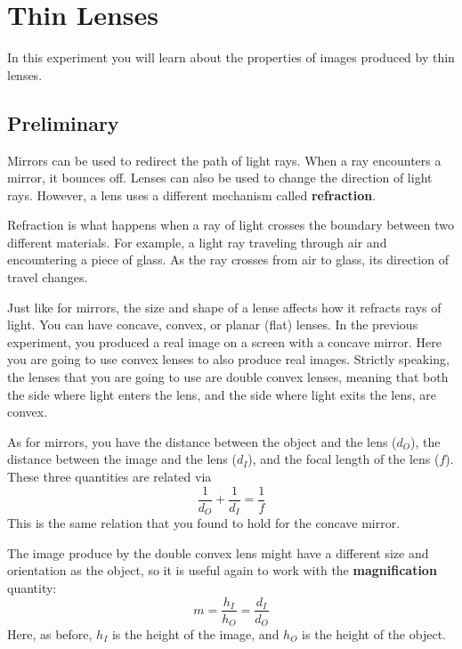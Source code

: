 \setcounter{chapter}{7}
\chapter{Thin Lenses}
In this experiment you will learn about the properties of images produced by thin lenses.
\section{Preliminary}
Mirrors can be used to redirect the path of light rays. When a ray encounters a mirror, it bounces off. Lenses can also be used to change the direction of light rays. However, a lens uses a different mechanism called \textbf{refraction}.

Refraction is what happens when a ray of light crosses the boundary between two different materials. For example, a light ray traveling through air and encountering a piece of glass. As the ray crosses from air to glass, its direction of travel changes.

Just like for mirrors, the size and shape of a lense affects how it refracts rays of light. You can have concave, convex, or planar (flat) lenses. In the previous experiment, you produced a real image on a screen with a concave mirror. Here you are going to use convex lenses to also produce real images. Strictly speaking, the lenses that you are going to use are double convex lenses, meaning that both the side where light enters the lens, and the side where light exits the lens, are convex.

As for mirrors, you have the distance between the object and the lens ($d_{O}$), the distance between the image and the lens ($d_{I}$), and the focal length of the lens ($f$). These three quantities are related via
\begin{equation}
    \frac{1}{d_{O}} + \frac{1}{d_{I}} = \frac{1}{f}
\end{equation}
This is the same relation that you found to hold for the concave mirror.

The image produce by the double convex lens might have a different size and orientation as the object, so it is useful again to work with the \textbf{magnification} quantity:
\begin{equation}
    m = \frac{h_{I}}{h_{O}} = \frac{d_{I}}{d_{O}}
\end{equation}
Here, as before, $h_{I}$ is the height of the image, and $h_{O}$ is the height of the object.
